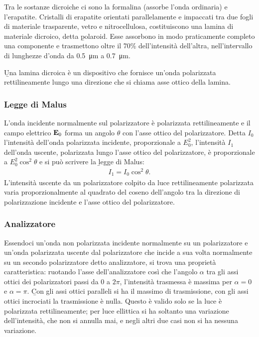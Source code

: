 Tra le sostanze dicroiche ci sono la formalina (assorbe l'onda ordinaria) e l'erapatite. Cristalli di erapatite orientati parallelamente e impaccati tra due fogli di materiale trasparente, vetro e nitrocellulosa, costituiscono una lamina di materiale dicroico, detta \b{polaroid}. Esse assorbono in modo praticamente completo una componente e trasmettono oltre il 70\% dell'intensità dell'altra, nell'intervallo di lunghezze d'onda da \SI{0.5}{\um} a \SI{0.7}{\um}.

\b{Una lamina dicroica è un dispositivo che fornisce un'onda polarizzata rettilineamente lungo una direzione che si chiama asse ottico della lamina}.

\subsubsection{Legge di Malus}
L'onda incidente normalmente sul polarizzatore è polarizzata rettilineamente e il campo elettrico $\mathbf{E}_0$ forma un angolo $\theta$ con l'asse ottico del polarizzatore. Detta $I_0$ l'intensità dell'onda polarizzata incidente, proporzionale a $E_0^2$, l'intensità $I_1$ dell'onda uscente, polarizzata lungo l'asse ottico del polarizzatore, è proporzionale a $E_0^2\cos^2{\theta}$ e si può scrivere la \b{legge di Malus}:
\begin{equation}\begin{split}
I_1=I_0\cos^2{\theta}.
\end{split}\end{equation}
L'intensità uscente da un polarizzatore colpito da luce rettilineamente polarizzata varia proporzionalmente al quadrato del coseno dell'angolo tra la direzione di polarizzazione incidente e l'asse ottico del polarizzatore.

\subsubsection{Analizzatore}
Essendoci un'onda non polarizzata incidente normalmente su un polarizzatore e un'onda polarizzata uscente dal polarizzatore che incide a sua volta normalmente su un secondo polarizzatore detto analizzatore, si trova una proprietà caratteristica: ruotando l'asse dell'analizzatore così che l'angolo $\alpha$ tra gli assi ottici dei polarizzatori passi da 0 a $2\pi$, l'intensità trasmessa è massima per $\alpha=0$ e $\alpha=\pi$. \b{Con gli assi ottici paralleli si ha il massimo di trasmissione, con gli assi ottici incrociati la trasmissione è nulla}. Questo è valido solo se la luce è polarizzata rettilineamente; per luce ellittica si ha soltanto una variazione dell'intensità, che non si annulla mai, e negli altri due casi non si ha nessuna variazione.

